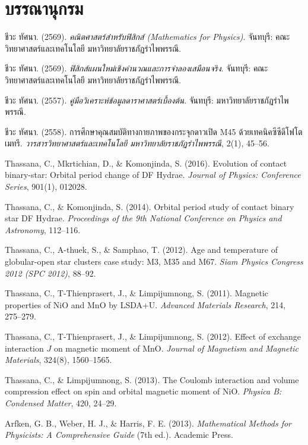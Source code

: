\chapter*{บรรณานุกรม}
\label{chap:references}

\begin{enumerate}[label={[\arabic*]}, leftmargin=2.5em, itemsep=7pt]
    \item ชีวะ ทัศนา. (2569). \textit{คณิตศาสตร์สำหรับฟิสิกส์ (Mathematics for Physics)}. จันทบุรี: คณะวิทยาศาสตร์และเทคโนโลยี มหาวิทยาลัยราชภัฏรำไพพรรณี.
    \item ชีวะ ทัศนา. (2569). \textit{ฟิสิกส์แผนใหม่เชิงคำนวณและการจำลองเสมือนจริง}. จันทบุรี: คณะวิทยาศาสตร์และเทคโนโลยี มหาวิทยาลัยราชภัฏรำไพพรรณี.
    \item ชีวะ ทัศนา. (2557). \textit{คู่มือวิเคราะห์ข้อมูลดาราศาสตร์เบื้องต้น}. จันทบุรี: มหาวิทยาลัยราชภัฏรำไพพรรณี.
    \item ชีวะ ทัศนา. (2558). การศึกษาคุณสมบัติทางกายภาพของกระจุกดาวเปิด M45 ด้วยเทคนิคซีซีดีโฟโตเมทรี. \textit{วารสารวิทยาศาสตร์และเทคโนโลยี มหาวิทยาลัยราชภัฏรำไพพรรณี}, 2(1), 45--56.
    \item Thassana, C., Mkrtichian, D., \& Komonjinda, S. (2016). Evolution of contact binary-star: Orbital period change of DF Hydrae. \textit{Journal of Physics: Conference Series}, 901(1), 012028.
    \item Thassana, C., \& Komonjinda, S. (2014). Orbital period study of contact binary star DF Hydrae. \textit{Proceedings of the 9th National Conference on Physics and Astronomy}, 112--116.
    \item Thassana, C., A-thuek, S., \& Samphao, T. (2012). Age and temperature of globular-open star clusters case study: M3, M35 and M67. \textit{Siam Physics Congress 2012 (SPC 2012)}, 88--92.
    \item Thassana, C., T-Thienprasert, J., \& Limpijumnong, S. (2011). Magnetic properties of NiO and MnO by LSDA+U. \textit{Advanced Materials Research}, 214, 275--279.
    \item Thassana, C., T-Thienprasert, J., \& Limpijumnong, S. (2012). Effect of exchange interaction $J$ on magnetic moment of MnO. \textit{Journal of Magnetism and Magnetic Materials}, 324(8), 1560--1565.
    \item Thassana, C., \& Limpijumnong, S. (2013). The Coulomb interaction and volume compression effect on spin and orbital magnetic moment of NiO. \textit{Physica B: Condensed Matter}, 420, 24--29.
    \item Arfken, G. B., Weber, H. J., \& Harris, F. E. (2013). \textit{Mathematical Methods for Physicists: A Comprehensive Guide} (7th ed.). Academic Press.

\end{enumerate}
